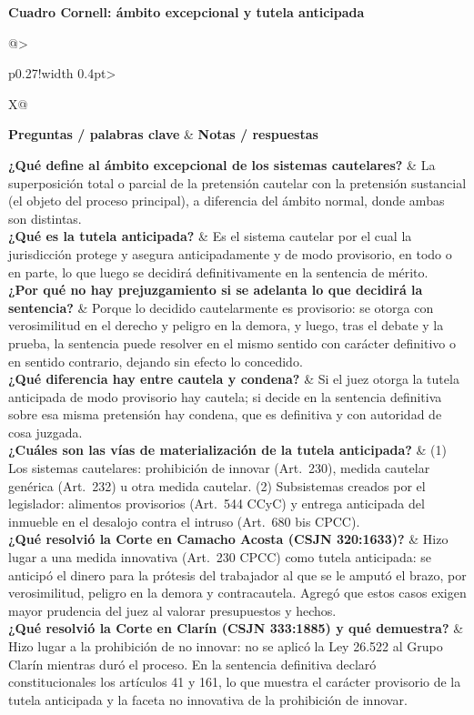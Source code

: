 \documentclass[12pt,oneside]{book}
\makeatletter
\newcommand{\cornelltitle}[1]{\par\bigskip\noindent\textbf{\sffamily Cuadro Cornell: #1}\par\nopagebreak\smallskip}
\newcommand{\cqrow}[2]{\textbf{#1} & #2 \\[0.5em]}
\newcommand{\cornellblock}[1]{%
  \noindent\begin{tabularx}{\textwidth}{@{}>{\raggedright\arraybackslash}p{0.27\textwidth}!{\vrule width 0.4pt}>{\raggedright\arraybackslash}X@{}}
  \toprule
  \textbf{Preguntas / palabras clave} & \textbf{Notas / respuestas} \\
  \midrule
  #1
  \bottomrule
  \end{tabularx}\par}
\makeatother
\begin{document}
\cornelltitle{ámbito excepcional y tutela anticipada}
\cornellblock{
\cqrow{¿Qué define al ámbito excepcional de los sistemas cautelares?}{La superposición total o parcial de la pretensión cautelar con la pretensión sustancial (el objeto del proceso principal), a diferencia del ámbito normal, donde ambas son distintas.
}
\cqrow{¿Qué es la tutela anticipada?}{Es el sistema cautelar por el cual la jurisdicción protege y asegura anticipadamente y de modo provisorio, en todo o en parte, lo que luego se decidirá definitivamente en la sentencia de mérito.
}
\cqrow{¿Por qué no hay prejuzgamiento si se adelanta lo que decidirá la sentencia?}{Porque lo decidido cautelarmente es provisorio: se otorga con verosimilitud en el derecho y peligro en la demora, y luego, tras el debate y la prueba, la sentencia puede resolver en el mismo sentido con carácter definitivo o en sentido contrario, dejando sin efecto lo concedido.
}
\cqrow{¿Qué diferencia hay entre cautela y condena?}{Si el juez otorga la tutela anticipada de modo provisorio hay cautela; si decide en la sentencia definitiva sobre esa misma pretensión hay condena, que es definitiva y con autoridad de cosa juzgada.
}
\cqrow{¿Cuáles son las vías de materialización de la tutela anticipada?}{(1) Los sistemas cautelares: prohibición de innovar (Art.~230), medida cautelar genérica (Art.~232) u otra medida cautelar. (2) Subsistemas creados por el legislador: alimentos provisorios (Art.~544 CCyC) y entrega anticipada del inmueble en el desalojo contra el intruso (Art.~680 bis CPCC).
}
\cqrow{¿Qué resolvió la Corte en Camacho Acosta (CSJN 320:1633)?}{Hizo lugar a una medida innovativa (Art.~230 CPCC) como tutela anticipada: se anticipó el dinero para la prótesis del trabajador al que se le amputó el brazo, por verosimilitud, peligro en la demora y contracautela. Agregó que estos casos exigen mayor prudencia del juez al valorar presupuestos y hechos.
}
\cqrow{¿Qué resolvió la Corte en Clarín (CSJN 333:1885) y qué demuestra?}{Hizo lugar a la prohibición de no innovar: no se aplicó la Ley 26.522 al Grupo Clarín mientras duró el proceso. En la sentencia definitiva declaró constitucionales los artículos 41 y 161, lo que muestra el carácter provisorio de la tutela anticipada y la faceta no innovativa de la prohibición de innovar.
}
}
\medskip
\end{document}
